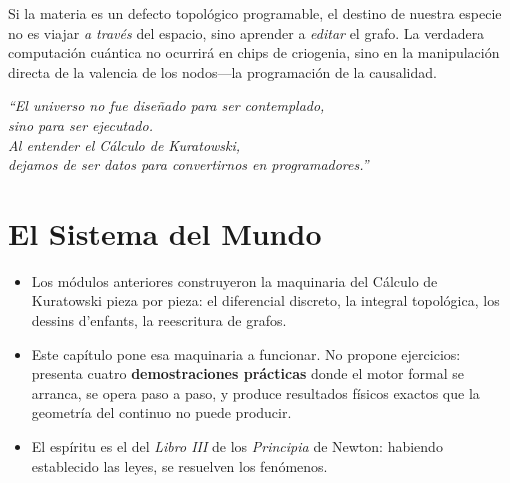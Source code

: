 \documentclass[11pt, a4paper, openany]{book}
\newenvironment{introduction}[1][Sinopsis del M\'odulo]{%
  \begin{tcolorbox}[
    enhanced,colback=structure!5,colframe=structure,
    colbacktitle=structure,coltitle=white,
    fonttitle=\small\bfseries,title={#1},
    arc=2pt,boxrule=0.7pt,
    left=8pt,right=8pt,top=6pt,bottom=6pt,
    before skip=12pt,after skip=12pt
  ]\itshape\begin{itemize}[leftmargin=*,itemsep=2pt,parsep=0pt]
}{%
  \end{itemize}\end{tcolorbox}
}
\begin{document}
Si la materia es un defecto topol\'ogico programable, el destino de
nuestra especie no es viajar \emph{a trav\'es} del espacio, sino
aprender a \emph{editar} el grafo. La verdadera computaci\'on
cu\'antica no ocurrir\'a en chips de criogenia, sino en la
manipulaci\'on directa de la valencia de los nodos---la
programaci\'on de la causalidad.

\bigskip
\begin{center}
\large\itshape
``El universo no fue dise\~nado para ser contemplado,\\
sino para ser ejecutado.\\
Al entender el C\'alculo de Kuratowski,\\
dejamos de ser datos para convertirnos en programadores.''
\end{center}


\chapter*{El Sistema del Mundo}

\begin{introduction}[Prop\'osito de Este Cap\'itulo]
  \item Los m\'odulos anteriores construyeron la maquinaria del C\'alculo
        de Kuratowski pieza por pieza: el diferencial discreto, la integral
        topol\'ogica, los dessins d'enfants, la reescritura de grafos.
  \item Este cap\'itulo pone esa maquinaria a funcionar. No propone
        ejercicios: presenta cuatro \textbf{demostraciones pr\'acticas}
        donde el motor formal se arranca, se opera paso a paso, y produce
        resultados f\'isicos exactos que la geometr\'ia del continuo no
        puede producir.
  \item El esp\'iritu es el del \textit{Libro III} de los \textit{Principia}
        de Newton: habiendo establecido las leyes, se resuelven los
        fen\'omenos.
\end{introduction}

\bigskip

\end{document}
